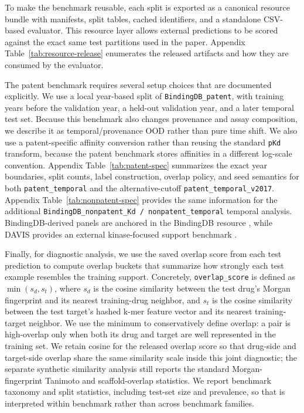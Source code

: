 To make the benchmark reusable, each split is exported as a canonical resource bundle with manifests, split tables, cached identifiers, and a standalone CSV-based evaluator. This resource layer allows external predictions to be scored against the exact same test partitions used in the paper. Appendix Table~\ref{tab:resource-release} enumerates the released artifacts and how they are consumed by the evaluator.

The patent benchmark requires several setup choices that are documented explicitly. We use a local year-based split of \texttt{BindingDB\_patent}, with training years before the validation year, a held-out validation year, and a later temporal test set. Because this benchmark also changes provenance and assay composition, we describe it as temporal/provenance OOD rather than pure time shift. We also use a patent-specific affinity conversion rather than reusing the standard \texttt{pKd} transform, because the patent benchmark stores affinities in a different log-scale convention. Appendix Table~\ref{tab:patent-spec} summarizes the exact year boundaries, split counts, label construction, overlap policy, and seed semantics for both \texttt{patent\_temporal} and the alternative-cutoff \texttt{patent\_temporal\_v2017}. Appendix Table~\ref{tab:nonpatent-spec} provides the same information for the additional \texttt{BindingDB\_nonpatent\_Kd / nonpatent\_temporal} temporal analysis. BindingDB-derived panels are anchored in the BindingDB resource \citep{liu2007bindingdb}, while DAVIS provides an external kinase-focused support benchmark \citep{davis2011kinase}.

Finally, for diagnostic analysis, we use the saved overlap score from each test prediction to compute overlap buckets that summarize how strongly each test example resembles the training support. Concretely, \texttt{overlap\_score} is defined as $\min(s_d, s_t)$, where $s_d$ is the cosine similarity between the test drug's Morgan fingerprint and its nearest training-drug neighbor, and $s_t$ is the cosine similarity between the test target's hashed k-mer feature vector and its nearest training-target neighbor. We use the minimum to conservatively define overlap: a pair is high-overlap only when both its drug and target are well represented in the training set. We retain cosine for the released overlap score so that drug-side and target-side overlap share the same similarity scale inside this joint diagnostic; the separate synthetic similarity analysis still reports the standard Morgan-fingerprint Tanimoto and scaffold-overlap statistics. We report benchmark taxonomy and split statistics, including test-set size and prevalence, so that \AUPRC{} is interpreted within benchmark rather than across benchmark families.
